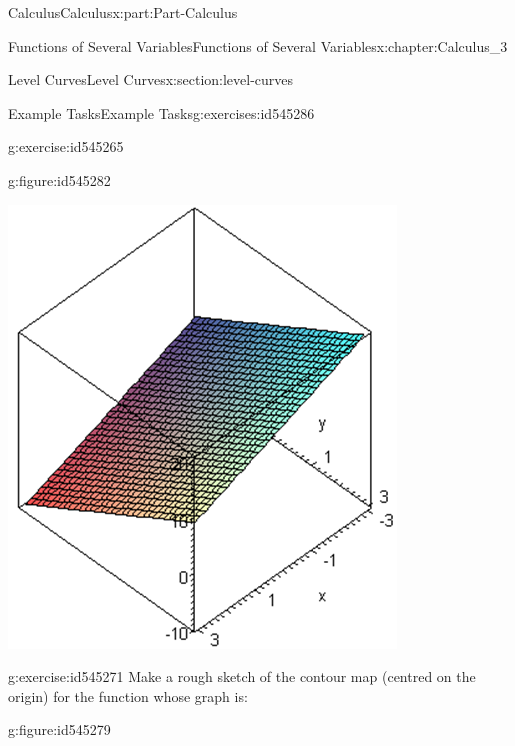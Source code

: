 \documentclass[oneside,10pt,]{book}
\numberwithin{equation}{section}
\begin{document}
\begin{partptx}{Calculus}{}{Calculus}{}{}{x:part:Part-Calculus}
\begin{chapterptx}{Functions of Several Variables}{}{Functions of Several Variables}{}{}{x:chapter:Calculus_3}
\begin{sectionptx}{Level Curves}{}{Level Curves}{}{}{x:section:level-curves}
\begin{exercises-subsection-numberless}{Example Tasks}{}{Example Tasks}{}{}{g:exercises:id545286}
\begin{divisionexercise}{2}{}{}{g:exercise:id545265}
\begin{figureptx}{}{g:figure:id545282}{}
\begin{image}{0.125}{0.75}{0.125}
\includegraphics[width=\linewidth]{./Calculus/Images/3/2_ET2.png}
\end{image}%
\tcblower
\end{figureptx}%
\end{divisionexercise}%
\begin{divisionexercise}{3}{}{}{g:exercise:id545271}%
Make a rough sketch of the contour map (centred on the origin) for the function whose graph is:%
\begin{figureptx}{}{g:figure:id545279}{}%
\begin{image}{0.125}{0.75}{0.125}%

\end{image}
\end{figureptx}
\end{divisionexercise}
\end{exercises-subsection-numberless}
\end{sectionptx}
\end{chapterptx}
\end{partptx}
\end{document}
